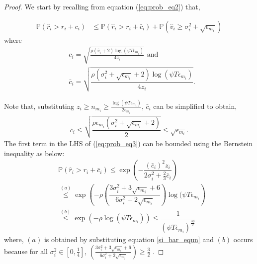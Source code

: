 \begin{proof}

We start by recalling from equation (\ref{eq:prob_eq2}) that,

\begin{align}
\mathbb{P}(\hat{r}_{i}> r_{i} + c_{i})
&\leq \mathbb{P}\left( \hat{r}_{i} > r_{i}+ \bar{c}_i\right) 
+ \mathbb{P}\left( \hat{v}_{i}\geq \sigma_{i}^{2}+\sqrt{\epsilon_{m_{i}}}\right)\label{eq:prob_eq3}
\end{align}
where 
\begin{align*}
&c_i =\sqrt{\frac{\rho (\hat{v}_i + 2)\log (\psi T\epsilon_{m_{i}})}{4 z_i}} \text{ and } \\
&\bar{c}_i=\sqrt{\dfrac{\rho (\sigma_{i}^{2}+\sqrt{\epsilon_{m_{i}}} + 2)\log(\psi T\epsilon_{m_{i}})}{4 z_i}}.
\end{align*}

Note that, substituting $ z_i \geq n_{m_i} \geq \frac{\log{(\psi T\epsilon_{m_{i}})}}{2\epsilon_{m_{i}}}$, $\bar{c}_i$ can be simplified to obtain,
\begin{align}
\bar{c}_i
\leq \sqrt{\dfrac{\rho\epsilon_{m_{i}}(\sigma_{i}^{2}+\sqrt{\epsilon_{m_{i}}} + 2)}{2}}\leq \sqrt{ \epsilon_{m_{i}}}.
\label{si_bar_equn}
\end{align}
%
The first term in the LHS of (\ref{eq:prob_eq3}) can be bounded using the Bernstein inequality as below:
\begin{align}
&\mathbb{P}\left( \hat{r}_{i} > r_{i}+ \bar{c}_i\right)\nonumber 
\le \exp\left(- \dfrac{(\bar{c}_i)^2 z_{i}}{2\sigma_i^2 + \frac{2}{3}\bar{c}_i} \right)\nonumber 
\\
& \overset{(a)}{\le} \exp\left(- \rho \left(\dfrac{3\sigma_{i}^{2}+3\sqrt{\epsilon_{m_{i}}} + 6}{6\sigma_i^2 + 2\sqrt{\epsilon_{m_i}}} \right)\log(\psi  T\epsilon_{m_{i}}\right)\nonumber \\
& \overset{(b)}{\leq} \exp\left(- \rho \log(\psi  T\epsilon_{m_{i}})\right) 
\le \dfrac{1}{(\psi  T\epsilon_{m_{i}})^{\frac{3\rho}{2}}}
\label{lhs1_equn}
\end{align}
where, $(a)$ is obtained by substituting equation \ref{si_bar_equn} and $(b)$ occurs because for all $\sigma_{i}^2 \in [0,\frac{1}{4}]$, $\left(\frac{3\sigma_{i}^{2}+3\sqrt{\epsilon_{m_{i}}} + 6}{6\sigma_i^2 + 2\sqrt{\epsilon_{m_i}}}\right) \geq \frac{3}{2}$ .


\end{proof}
